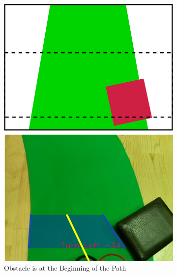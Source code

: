 \documentclass[a4paper,12pt]{article}
\begin{document}
\begin{figure}[H]

\setlength{\unitlength}{\textwidth} 

\centering

\begin{subfigure}{.31\textwidth}

\centering

\includegraphics[width=0.30\unitlength]{images/path_images/down_1}

\caption{\label{fig:dataP_down_1} Obstacle is at the Beginning of the Path}

\end{subfigure}%
\begin{subfigure}{.31\textwidth}

\centering


\end{subfigure}
\end{figure}
\end{document}
